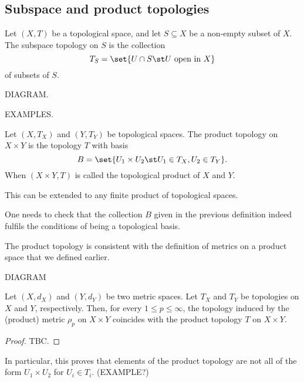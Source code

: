 \subsection{Subspace and product topologies}
\begin{ndfn}
  Let $(X,T)$ be a topological space, and let $S \subseteq X$ be a non-empty subset of $X$. The subspace topology on $S$ is the collection
  \begin{equation*}
    T_S = \set{U \cap S \st U \text{ open in } X}
  \end{equation*}
  of subsets of $S$.
\end{ndfn}

DIAGRAM.

EXAMPLES.

\begin{ndfn}
  Let $(X,T_X)$ and $(Y,T_Y)$ be topological spaces. The product topology on $X \times Y$ is the topology $T$ with basis
  \begin{equation*}
    B = \set{U_1 \times U_2 \st U_1 \in T_X, U_2 \in T_Y}.
  \end{equation*}
  When $(X \times Y, T)$ is called the topological product of $X$ and $Y$.
\end{ndfn}
This can be extended to any finite product of topological spaces.

\begin{remark}
  One needs to check that the collection $B$ given in the previous definition indeed fulfils the conditions of being a topological basis.
\end{remark}

The product topology is consistent with the definition of metrics on a product space that we defined earlier.

DIAGRAM

\begin{nthm}
  Let $(X,d_X)$ and $(Y,d_Y)$ be two metric spaces. Let $T_X$ and $T_Y$ be topologies on $X$ and $Y$, respectively. Then, for every $1 \leq p \leq \infty$, the topology induced by the (product) metric $\rho_p$ on $X \times Y$ coincides with the product topology $T$ on $X \times Y$.
\end{nthm}
\begin{proof}
  TBC.
\end{proof}

In particular, this proves that elements of the product topology are not all of the form $U_1 \times U_2$ for $U_i \in T_i$. (EXAMPLE?)

